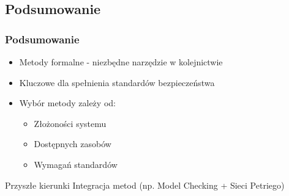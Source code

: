 \documentclass{beamer}
\begin{document}
\subsection{Podsumowanie}
\begin{frame}
\frametitle{Podsumowanie}
\begin{itemize}
\item Metody formalne - niezbędne narzędzie w kolejnictwie
\item Kluczowe dla spełnienia standardów bezpieczeństwa
\item Wybór metody zależy od:
\begin{itemize}
\item Złożoności systemu
\item Dostępnych zasobów
\item Wymagań standardów
\end{itemize}
\end{itemize}

\begin{block}{Przyszłe kierunki}
Integracja metod (np. Model Checking + Sieci Petriego)
\end{block}
\end{frame}
\end{document}
